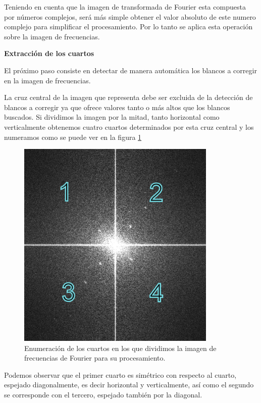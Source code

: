 \documentclass[10pt,a4paper, twoside]{report}
\begin{document}
Teniendo en cuenta que la imagen de transformada de Fourier esta compuesta por números complejos, será más simple obtener el valor absoluto de este numero complejo para simplificar el procesamiento. Por lo tanto se aplica esta operación sobre la imagen de frecuencias.

\textbf{Extracción de los cuartos}

El próximo paso consiste en detectar de manera automática los blancos a corregir en la imagen de frecuencias.



La cruz central de la imagen que representa debe ser excluida de la detección de blancos a corregir ya que ofrece valores tanto o más altos que los blancos buscados. Si dividimos la imagen por la mitad, tanto horizontal como verticalmente obtenemos cuatro cuartos determinados por esta cruz central y los numeramos como se puede ver en la figura \ref{CuartosFourier} 

\begin{figure}[!htb]
   \centering      
   \includegraphics[width=0.85\textwidth]{imagenes/CuartosFourier.jpg}
 \caption{Enumeración de los cuartos en los que dividimos la imagen de frecuencias de Fourier para su procesamiento.}
 \label{CuartosFourier}
\end{figure}

Podemos observar que el primer cuarto es simétrico con respecto al cuarto, espejado diagonalmente, es decir horizontal y verticalmente, así como el segundo se corresponde con el tercero, espejado también por la diagonal.
\end{document}

